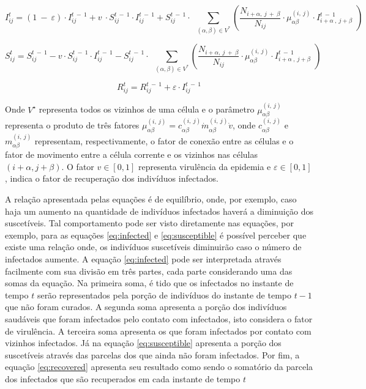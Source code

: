 \documentclass[
	11pt,				%
	openright,			%
	oneside,			%
	a4paper,			%
	english,			%
	french,				%
	spanish,			%
	brazil,				%
	]{abntex2}
\begin{document}
\begin{equation} \label{eq:infected}
I_{ij}^t=\left(1\:-\:\varepsilon \right)\cdot I_{ij}^{t\:-\:1}+v\:\cdot S_{ij}^{t\:-\:1}\cdot I_{ij}^{t\:-\:1}+S_{ij}^{t\:-\:1}\cdot \:\displaystyle \:\sum _{\left(\alpha ,\beta \right)\in V^{\ast }}^{ }\left(\frac{N_{i+\alpha ,\:j\:+\:\beta }}{N_{ij}}\cdot \mu _{\alpha \beta }^{\left(i,\:j\right)}\cdot I_{i+\alpha \:,\:j+\beta \:}^{t\:-\:1}\:\right)
\end{equation}

\begin{equation} \label{eq:susceptible}
S_{ij}^t=S_{ij}^{t\:-\:1}-v\cdot S_{ij}^{t\:-\:1}\cdot I_{ij}^{t\:-\:1}-S_{ij}^{t\:-\:1}\cdot \:\displaystyle \:\sum _{\left(\alpha ,\beta \right)\in V^{\ast }}^{ }\left(\frac{N_{i+\alpha ,\:j\:+\:\beta }}{N_{ij}}\cdot \mu _{\alpha \beta }^{\left(i,\:j\right)}\cdot I_{i+\alpha \:,\:j+\beta \:}^{t\:-\:1}\:\right)
\end{equation}

\begin{equation} \label{eq:recovered}
R_{ij}^t=R_{ij}^{t\:-\:1}+\varepsilon \cdot I_{ij}^{t\:-\:1}
\end{equation}

\par Onde $V^\star$ representa todos os vizinhos de uma célula e o parâmetro $\mu_{\alpha \beta}^{\left(i,\:j\right)}$ representa o produto de três fatores $\mu_{\alpha \beta}^{\left(i,\:j\right)} = c_{\alpha \beta}^{\left(i,\:j\right)} \dot m_{\alpha \beta}^{\left(i,\:j\right)} \dot v$, onde $c_{\alpha \beta}^{\left(i,\:j\right)}$ e $ m_{\alpha \beta}^{\left(i,\:j\right)}$ representam, respectivamente, o fator de conexão entre as células e o fator de movimento entre a célula corrente e os vizinhos nas células $(i + \alpha, j + \beta)$. O fator $v \in [0, 1]$ representa virulência da epidemia e $\varepsilon \in [0, 1]$, indica o fator de recuperação dos indivíduos infectados.

\par A relação apresentada pelas equações é de equilíbrio, onde, por exemplo, caso haja um aumento na quantidade de indivíduos infectados haverá a diminuição dos suscetíveis. Tal comportamento pode ser visto diretamente nas equações, por exemplo, para as equações \ref{eq:infected} e \ref{eq:susceptible} é possível perceber que existe uma relação onde, os indivíduos suscetíveis diminuirão caso o número de infectados aumente. A equação \ref{eq:infected} pode ser interpretada através facilmente com sua divisão em três partes, cada parte considerando uma das somas da equação. Na primeira soma, é tido que os infectados no instante de tempo $t$ serão representados pela porção de indivíduos do instante de tempo $t - 1$ que não foram curados. A segunda soma apresenta a porção dos indivíduos saudáveis que foram infectados pelo contato com infectados, isto considera o fator de virulência. A terceira soma apresenta os que foram infectados por contato com vizinhos infectados. Já na equação \ref{eq:susceptible} apresenta a porção dos suscetíveis através das parcelas dos que ainda não foram infectados. Por fim, a equação \ref{eq:recovered} apresenta seu resultado como sendo o somatório da parcela dos infectados que são recuperados em cada instante de tempo $t$
\end{document}
